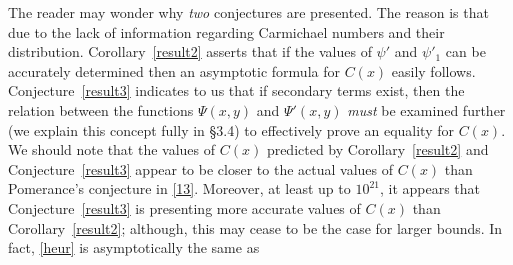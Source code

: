 \documentclass[11pt]{article}
\theoremstyle{plain}
\theoremstyle{definition}
\theoremstyle{remark}
\numberwithin{equation}{subsection}
\begin{document}
\indent The reader may wonder why \emph{two} conjectures are presented. The reason is that due to the lack of information regarding Carmichael numbers and their distribution. Corollary~\ref{result2} asserts that if the values of $\psi'$ and $\psi'_1$ can be accurately determined then an asymptotic formula for $C(x)$ easily follows. Conjecture~\ref{result3} indicates to us that if secondary terms exist, then the relation between the functions $\Psi(x,y)$ and $\Psi'(x,y)$ \emph{must} be examined further (we explain this concept fully in \S 3.4) to effectively prove an equality for $C(x)$. We should note that the values of $C(x)$ predicted by Corollary~\ref{result2} and Conjecture~\ref{result3} appear to be closer to the actual values of $C(x)$ than Pomerance's conjecture in \eqref{13}. Moreover, at least up to $10^{21}$, it appears that Conjecture~\ref{result3} is presenting more accurate values of $C(x)$ than Corollary~\ref{result2}; although, this may cease to be the case for larger bounds. In fact, \eqref{heur} is asymptotically the same as
\end{document}
